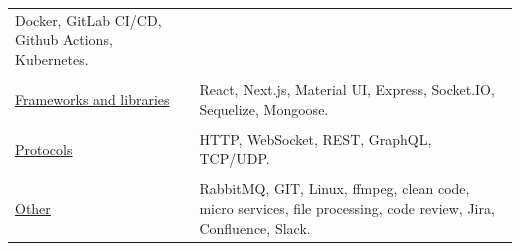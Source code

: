 \documentclass[12pt]{article}
\begin{document}
\begin{tabularx}{500pt}{eX}
        Docker, GitLab CI/CD, Github Actions, Kubernetes. \\

        &\\

        \underline{Frameworks and libraries} &

        React, Next.js, Material UI, Express, Socket.IO, Sequelize, Mongoose. \\

        &\\

        \underline{Protocols} &

        HTTP, WebSocket, REST, GraphQL, TCP/UDP. \\

        &\\
        \underline{Other} &

        RabbitMQ, GIT, Linux, ffmpeg, clean code, micro services, file processing, code review, Jira, Confluence, Slack.
    \end{tabularx}
\end{document}
